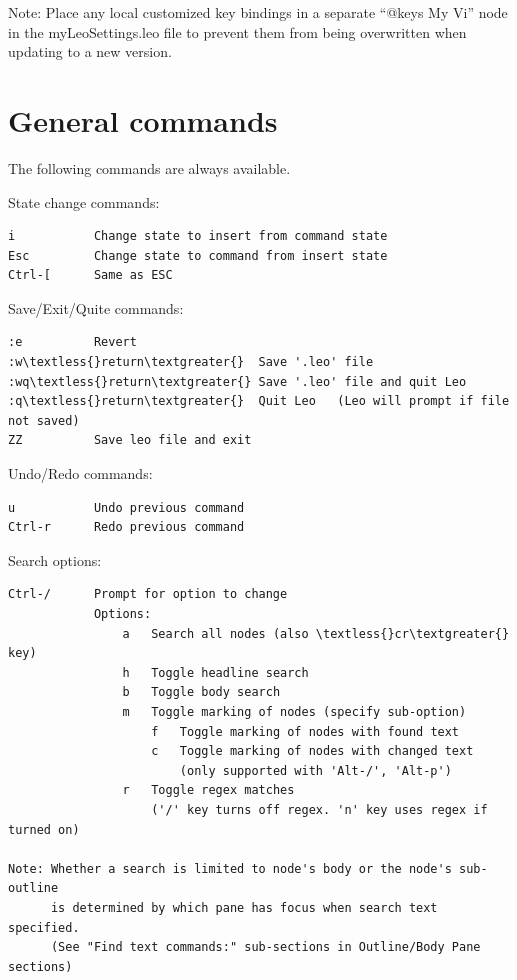 \documentclass[a4paper,10pt,english]{sphinxmanual}
\begin{document}
Note: Place any local customized key bindings in a separate
``@keys My Vi'' node in the myLeoSettings.leo file to prevent
them from being overwritten when updating to a new version.


\section{General commands}
\label{vimBindings:general-commands}
The following commands are always available.

State change commands:

\begin{Verbatim}[commandchars=\\\{\}]
i           Change state to insert from command state
Esc         Change state to command from insert state
Ctrl-[      Same as ESC
\end{Verbatim}

Save/Exit/Quite commands:

\begin{Verbatim}[commandchars=\\\{\}]
:e          Revert
:w\textless{}return\textgreater{}  Save '.leo' file
:wq\textless{}return\textgreater{} Save '.leo' file and quit Leo
:q\textless{}return\textgreater{}  Quit Leo   (Leo will prompt if file not saved)
ZZ          Save leo file and exit
\end{Verbatim}

Undo/Redo commands:

\begin{Verbatim}[commandchars=\\\{\}]
u           Undo previous command
Ctrl-r      Redo previous command
\end{Verbatim}

Search options:

\begin{Verbatim}[commandchars=\\\{\}]
Ctrl-/      Prompt for option to change
            Options:
                a   Search all nodes (also \textless{}cr\textgreater{} key)
                h   Toggle headline search
                b   Toggle body search
                m   Toggle marking of nodes (specify sub-option)
                    f   Toggle marking of nodes with found text
                    c   Toggle marking of nodes with changed text
                        (only supported with 'Alt-/', 'Alt-p')
                r   Toggle regex matches
                    ('/' key turns off regex. 'n' key uses regex if turned on)

Note: Whether a search is limited to node's body or the node's sub-outline
      is determined by which pane has focus when search text specified.
      (See "Find text commands:" sub-sections in Outline/Body Pane sections)
\end{Verbatim}
\end{document}
